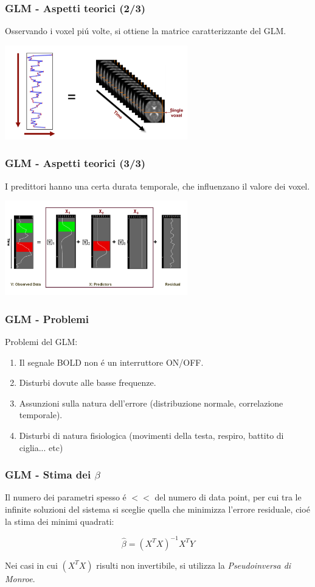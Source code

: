 \documentclass{beamer}
\begin{document}
\begin{frame}
\frametitle{GLM - Aspetti teorici (2/3)}
Osservando i voxel pi\'u  volte, si ottiene la \alert{matrice caratterizzante} del GLM.

\includegraphics[keepaspectratio, width = 300px	]{Images/glm_matrix.png}
\end{frame}

\begin{frame}
\frametitle{GLM - Aspetti teorici (3/3)}
I predittori hanno una certa durata temporale, che influenzano il valore dei voxel.

\includegraphics[keepaspectratio, width = 300px	]{Images/glm_visual.png}
\end{frame}

\begin{frame}
\frametitle{GLM - Problemi}
Problemi del GLM:
\begin{enumerate}
\item Il segnale BOLD non \'e un interruttore ON/OFF.
\item Disturbi dovute alle basse frequenze.
\item Assunzioni sulla natura dell'errore (distribuzione normale, correlazione temporale).
\item Disturbi di natura fisiologica (movimenti della testa, respiro, battito di ciglia... etc)
\end{enumerate}
\end{frame}

\begin{frame}
\frametitle{GLM - Stima dei $\beta$}
Il numero dei parametri spesso \'e $<<$ del numero di data point, per cui tra le infinite soluzioni del sistema si sceglie quella che minimizza l'errore residuale, cio\'e la \alert{stima dei minimi quadrati}:

$$ 	\hat{\beta} = (X^TX)^{-1} X^TY$$

Nei casi in cui $(X^TX)$ risulti non invertibile, si utilizza la \emph{Pseudoinversa di Monroe}.
\end{frame}
\end{document}
